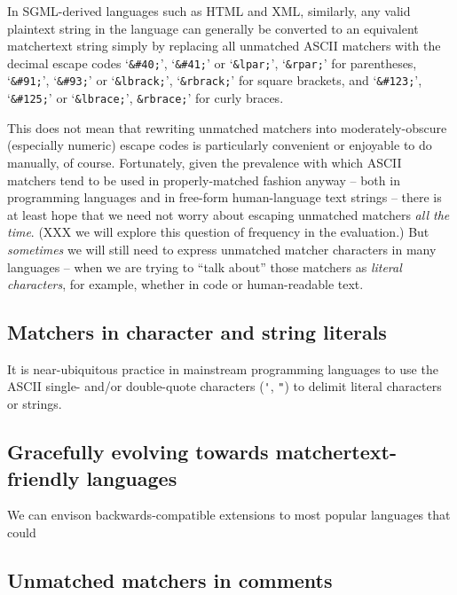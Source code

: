 In SGML-derived languages such as HTML and XML, similarly,
any valid plaintext string in the language
can generally be converted to an equivalent matchertext string
simply by replacing all unmatched ASCII matchers
with the decimal escape codes
`\verb|&#40;|', `\verb|&#41;|' or
`\verb|&lpar;|', `\verb|&rpar;|' for parentheses,
`\verb|&#91;|', `\verb|&#93;|' or
`\verb|&lbrack;|', `\verb|&rbrack;|' for square brackets, and
`\verb|&#123;|', `\verb|&#125;|' or
`\verb|&lbrace;|', \verb|&rbrace;|' for curly braces.

This does not mean that rewriting unmatched matchers into moderately-obscure
(especially numeric) escape codes
is particularly convenient or enjoyable to do manually, of course.
Fortunately, given the prevalence with which ASCII matchers
tend to be used in properly-matched fashion anyway --
both in programming languages and in free-form human-language text strings --
there is at least hope that we need not worry about escaping unmatched matchers
\emph{all the time}.
(XXX we will explore this question of frequency in the evaluation.)
But \emph{sometimes} we will still need to express
unmatched matcher characters in many languages --
when we are trying to ``talk about'' those matchers
as \emph{literal characters}, for example,
whether in code or human-readable text.

\subsection{Matchers in character and string literals}

It is near-ubiquitous practice in mainstream programming languages 
to use the ASCII single- and/or double-quote characters (\verb|'|, \verb|"|)
to delimit literal characters or strings.

\subsection{Gracefully evolving towards matchertext-friendly languages}

We can envison backwards-compatible extensions to most popular languages
that could 


\subsection{Unmatched matchers in comments}


